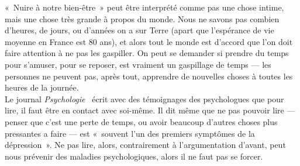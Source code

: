 \documentclass[12pt,a4paper]{article}
\begin{document}
«~Nuire à notre bien-être~» peut être interprété comme pas une chose intime,
mais une chose très grande à propos du monde. Nous ne savons pas combien
d'heures, de jours, ou d'années on a sur Terre (apart que l'espérance de vie
moyenne en France est 80 ans), et alors tout le monde est d'accord que l'on doit
faire attention à ne pas les gaspiller. On peut se demander si prendre du temps
pour s'amuser, pour se reposer, est vraiment un gaspillage de temps --- les
personnes ne peuvent pas, après tout, apprendre de nouvelles choses à toutes les
heures de la journée.\\

Le journal \textit{Psychologie}~\nocite{psychlire} écrit avec des témoignages des
psychologues que pour lire, il faut être en contact avec soi-même. Il dit même
que ne pas pouvoir lire --- penser que c'est une perte de temps, ou avoir
beaucoup d'autres choses plus pressantes a faire --- est «~souvent l’un des
premiers symptômes de la dépression~». Ne pas lire, alors, contrairement à
l'argumentation d'avant, peut nous prévenir des maladies psychologiques, alors
il ne faut pas se forcer.



\end{document}
